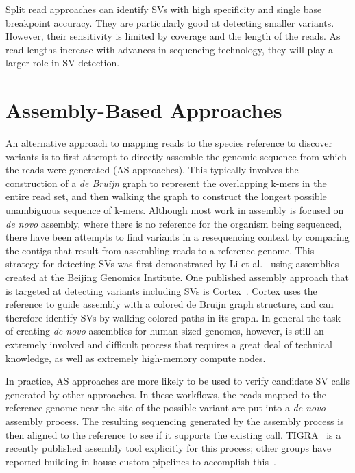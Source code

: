 Split read approaches can identify SVs with high specificity and single base breakpoint accuracy. They are particularly good at detecting smaller variants. However, their sensitivity is limited by coverage and the length of the reads. As read lengths increase with advances in sequencing technology, they will play a larger role in SV detection.

\section{Assembly-Based Approaches}

An alternative approach to mapping reads to the species reference to discover variants is to first attempt to directly assemble the genomic sequence from which the reads were generated (AS approaches). This typically involves the construction of a \emph{de Bruijn} graph to represent the overlapping k-mers in the entire read set, and then walking the graph to construct the longest possible unambiguous sequence of k-mers. Although most work in assembly is focused on \emph{de novo} assembly, where there is no reference for the organism being sequenced, there have been attempts to find variants in a resequencing context by comparing the contigs that result from assembling reads to a reference genome. This strategy for detecting SVs was first demonstrated by Li et al.~\cite{Li:2011p1734} using assemblies created at the Beijing Genomics Institute. One published assembly approach that is targeted at detecting variants including SVs is Cortex~\cite{Iqbal:2012p1837}. Cortex uses the reference to guide assembly with a colored de Bruijn graph structure, and can therefore identify SVs by walking colored paths in its graph. In general the task of creating \emph{de novo} assemblies for human-sized genomes, however, is still an extremely involved and difficult process that requires a great deal of technical knowledge, as well as extremely high-memory compute nodes.

In practice, AS approaches are more likely to be used to verify candidate SV calls generated by other approaches. In these workflows, the reads mapped to the reference genome near the site of the possible variant are put into a \emph{de novo} assembly process. The resulting sequencing generated by the assembly process is then aligned to the reference to see if it supports the existing call. TIGRA~\cite{Chen:2013gf} is a recently published assembly tool explicitly for this process; other groups have reported building in-house custom pipelines to accomplish this~\cite{Pleasance:2010p533,Malhotra:2013eh}.

